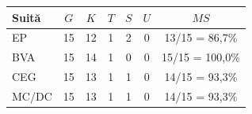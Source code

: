\begin{center}
\begingroup\small
\begin{tabular}{@{}lcccccc@{}}
\toprule
Suită & $G$ & $K$ & $T$ & $S$ & $U$ & $MS$ \\
\midrule
EP & 15 & 12 & 1 & 2 & 0 & 13/15 = 86,7\% \\
BVA & 15 & 14 & 1 & 0 & 0 & 15/15 = 100,0\% \\
CEG & 15 & 13 & 1 & 1 & 0 & 14/15 = 93,3\% \\
MC/DC & 15 & 13 & 1 & 1 & 0 & 14/15 = 93,3\% \\
\bottomrule
\end{tabular}
\endgroup
\end{center}
